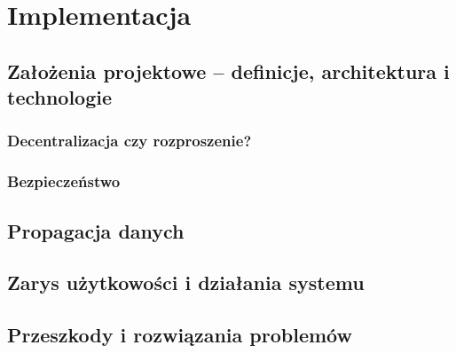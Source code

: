 \chapter{Implementacja}
\label{cha:implementacja}

\section{Założenia projektowe -- definicje, architektura i technologie}
\label{sec:zalozeniaProjektu}

\subsection{Decentralizacja czy rozproszenie?}
\label{sec:decentralizacjaCzyRozproszenie}

\subsection{Bezpieczeństwo}
\label{sec:security}

\section{Propagacja danych}
\label{sec:dataPropagation}

\section{Zarys użytkowości i działania systemu}
\label{sec:UX}

\section{Przeszkody i rozwiązania problemów}
\label{sec:whatWentWrong}

